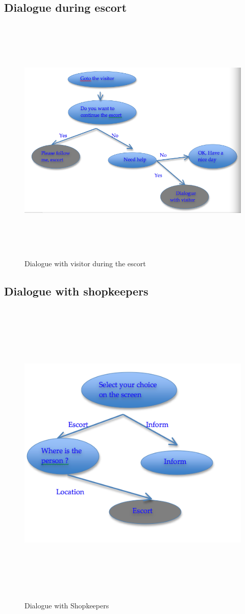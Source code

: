 \documentclass{article}
\begin{document}
\subsection{Dialogue during escort}
\begin{figure}[htbp]
\begin{center}
\includegraphics[height=12cm]{fig/EscortDialogue}
\caption{Dialogue with visitor during the escort}
\label{FigVisitorDialogueII}
\end{center}
\end{figure}
\subsection{Dialogue with shopkeepers}
\begin{figure}[htbp]
\begin{center}
\includegraphics[height=15cm]{fig/VisitorDialogue}
\caption{Dialogue with Shopkeepers}
\label{FigVisitorDialogue}
\end{center}
\end{figure}
\end{document}

